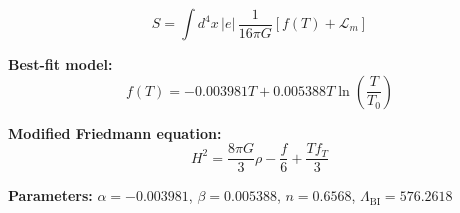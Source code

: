 
\begin{equation}
  S = \int d^4x \, |e| \, \frac{1}{16\pi G} \left[ f(T) + \mathcal{L}_m \right]
\end{equation}

\textbf{Best-fit model:}
\begin{equation}
  f(T) = -0.003981 T + 0.005388 T \ln\!\left(\frac{T}{T_0}\right)
\end{equation}

\textbf{Modified Friedmann equation:}
\begin{equation}
  H^2 = \frac{8\pi G}{3} \rho - \frac{f}{6} + \frac{T f_T}{3}
\end{equation}

\textbf{Parameters:}
$\alpha = -0.003981$, \quad
$\beta = 0.005388$, \quad
$n = 0.6568$, \quad
$\Lambda_{\text{BI}} = 576.2618$